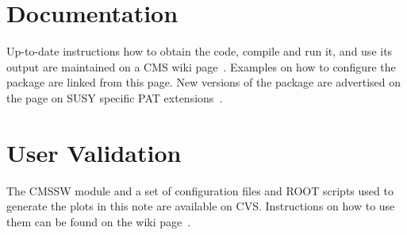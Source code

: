\documentclass{cmspaper}
\begin{document}

\clearpage
\section{Documentation}
Up-to-date instructions how to obtain the code, compile and run it, and use its
output are maintained on a CMS wiki page~\cite{twiki}. Examples on how to
configure the package are linked from this page. New versions of the package
are advertised on the page on SUSY specific PAT extensions~\cite{susypat}.


\section{User Validation}
The CMSSW module and a set of configuration files and ROOT scripts used to
generate the plots in this note are available on CVS. Instructions on how to
use them can be found on the wiki page~\cite{twiki}.

\end{document}
